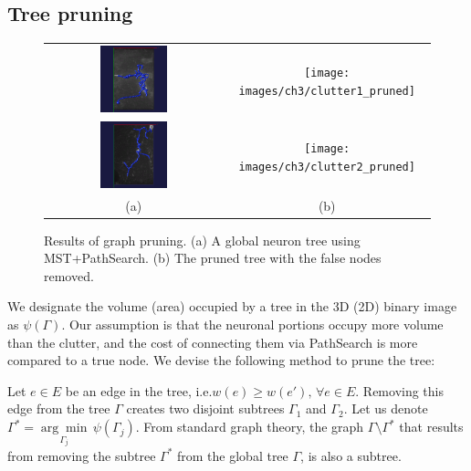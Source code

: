 \subsection{Tree pruning}
\begin{figure}[t]
\centering
\begin{tabular}{cc}
\includegraphics[width=0.4\textwidth]{images/ch3/clutter1}	&
\texttt{[image: images/ch3/clutter1\_pruned]}	\\
\includegraphics[width=0.4\textwidth]{images/ch3/clutter2}	&
\texttt{[image: images/ch3/clutter2\_pruned]}	\\
\scriptsize(a) & \scriptsize(b)
\end{tabular}
\caption[Tree2Tree-2 graph pruning]{Results of graph pruning. (a) A global neuron tree using MST+PathSearch. (b) The pruned tree with the false nodes removed.}
\label{fig:T2T2_pruning}
\end{figure}
We designate the volume (area) occupied by a tree in the 3D (2D) binary image as $\psi(\Gamma)$. Our assumption is that the neuronal portions occupy more volume than the clutter, and the cost of connecting them via PathSearch is more compared to a true node. We devise the following method to prune the tree: 

Let $e\in E$ be an edge in the tree, i.e.$w(e)\geq w(e'),\, \forall e\in E$. Removing this edge from the tree $\Gamma$ creates two disjoint subtrees $\Gamma_1$ and $\Gamma_2$. Let us denote $\Gamma^* = \underset{\Gamma_j}{\arg\min}\,\psi(\Gamma_j)$. From standard graph theory, the graph $\Gamma\setminus\Gamma^*$ that results from removing the subtree $\Gamma^*$ from the global tree $\Gamma$, is also a subtree. 

